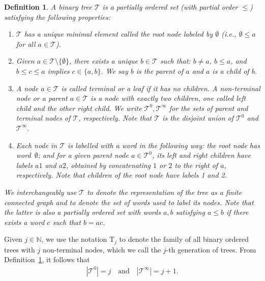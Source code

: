 \documentclass[%
11pt,  reqno]{amsart}
\newcommand{\5}{\textup{V}}
\newcommand{\noi}{\noindent}
\newtheorem{definition}[theorem]{Definition}
\theoremstyle{remark}
\newcommand{\TT}{\mathcal{T}}
\newcommand{\Tr}{\mathrm{T}}
\newcommand{\N}{\mathbb{N}}
\numberwithin{equation}{section}
\numberwithin{theorem}{section}
\begin{document}
\begin{definition}%
\label{DEF:tree}
\rm 
A binary tree $\TT$ is a partially ordered set (with partial order $\le$) satisfying the following properties:

\begin{enumerate}
\item[(i)] $\TT$ has a unique minimal element called the \textit{root node} labeled by $\emptyset$ (i.e., $\emptyset \le a$ for all $a \in \TT$). 

\smallskip 
\item[(ii)] Given $a\in \TT\setminus \{ \emptyset \}$, 
there exists a unique $b \in \TT$ such that: $b\ne a$, $b \le a$, and $b \le c \le a$ implies $c\in\{a,b\}$. We say $b$ is the \textit{parent} of $a$ and $a$ is a \textit{child} of $b$. 

\smallskip 
\item[(iii)] A node $a\in \TT$ is called \textit{terminal} or a \textit{leaf} if it has no children. A \textit{non-terminal node} or a \textit{parent} $a\in\TT$ is a node with exactly two children, one called \textit{left child} and the other \textit{right child}. %
We write $\TT^0, \TT^\infty$ for the sets of parent and terminal nodes of $\TT$, respectively.  Note that $\TT$ is the disjoint union of $\TT^0$ and $\TT^\infty$. 

\smallskip 
\item[(iv)]
Each node in $\TT$ is labelled with a word in the following way: the root node has word~$\emptyset$; and for a given parent node $a\in \TT^0$, its left and right children have labels $a1$ and $a2$,  obtained by concatenating $1$ or $2$ to the right of $a$, respectively. Note that children of the root node have labels 1 and 2. 


\end{enumerate}



\noi
We interchangeably use $\TT$ to denote the representation of the tree as a finite connected graph and to denote the set of words used to label its nodes. Note that the latter is also a partially ordered set with words $a,b$ satisfying $a\le b$ if there exists a word $c$ such that $b = ac$. 



\end{definition}


Given $j\in\N$, we use the notation $\Tr_j$ to denote the family of all binary ordered trees
with $j$ non-terminal nodes, which we call the $j$-th generation of trees. From Definition~\ref{DEF:tree}, it follows that 
\begin{align}
| \TT^0 |  = j \quad \text{and} \quad |\TT^\infty| = j+1.
\end{align}
\end{document}
